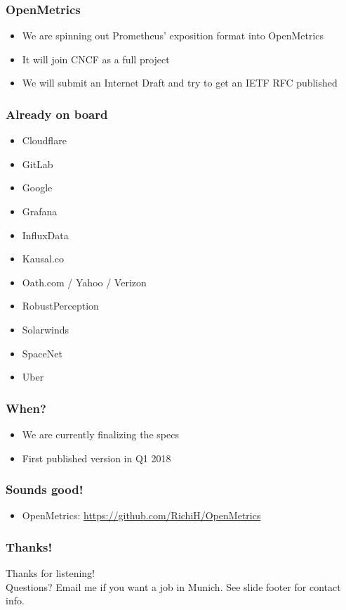 \documentclass[t]{beamer}
\begin{document}
\begin{frame}
	\frametitle{OpenMetrics}
	\begin{itemize}
		\item We are spinning out Prometheus' exposition format into OpenMetrics
		\item It will join CNCF as a full project
		\item We will submit an Internet Draft and try to get an IETF RFC published
	\end{itemize}
\end{frame}

\begin{frame}
	\frametitle{Already on board}
	\begin{itemize}
		\item Cloudflare
		\item GitLab
		\item Google
		\item Grafana
		\item InfluxData
		\item Kausal.co
		\item Oath.com / Yahoo / Verizon
		\item RobustPerception
		\item Solarwinds
		\item SpaceNet
		\item Uber
	\end{itemize}
\end{frame}

\begin{frame}
	\frametitle{When?}
	\begin{itemize}
		\item We are currently finalizing the specs
		\item First published version in Q1 2018
	\end{itemize}
\end{frame}


\begin{frame}
	\frametitle{Sounds good!}
	\begin{itemize}
		\item OpenMetrics: \url{https://github.com/RichiH/OpenMetrics}
	\end{itemize}
\end{frame}

\begin{frame}
	\frametitle{Thanks!}
		\begin{center}
			\vfill
			Thanks for listening!\\
			\vfill
			Questions?
			\vfill
			Email me if you want a job in Munich.
			\vfill
			See slide footer for contact info.
			\vfill
		\end{center}
\end{frame}
\end{document}
